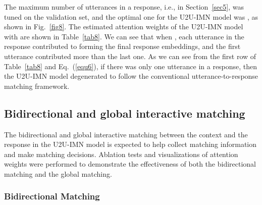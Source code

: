 \documentclass[journal]{IEEEtran}
\begin{document}
      The maximum number of utterances in a response, i.e.,  in Section~\ref{sec5}, was tuned on the validation set, and the optimal one for the U2U-IMN model was , as shown in Fig.~\ref{fig8}. The estimated attention weights  of the U2U-IMN model with   are shown in Table~\ref{tab8}. We can see that when ,  each utterance in the response contributed to forming the final response embeddings, and the first utterance contributed more than the last one.
      As we can see from the first row of Table~\ref{tab8} and Eq.~(\ref{equ6}), if there was only one utterance in a response, then the U2U-IMN model degenerated to follow the conventional utterance-to-response matching framework.


  \subsection{Bidirectional and global interactive matching}

    The bidirectional and global interactive matching between the context and the response in the U2U-IMN model is expected to help collect matching information and make matching decisions. Ablation tests and visualizations of attention weights were performed to demonstrate the effectiveness of both the bidirectional matching and the global matching.

    \subsubsection{Bidirectional Matching}
\end{document}
